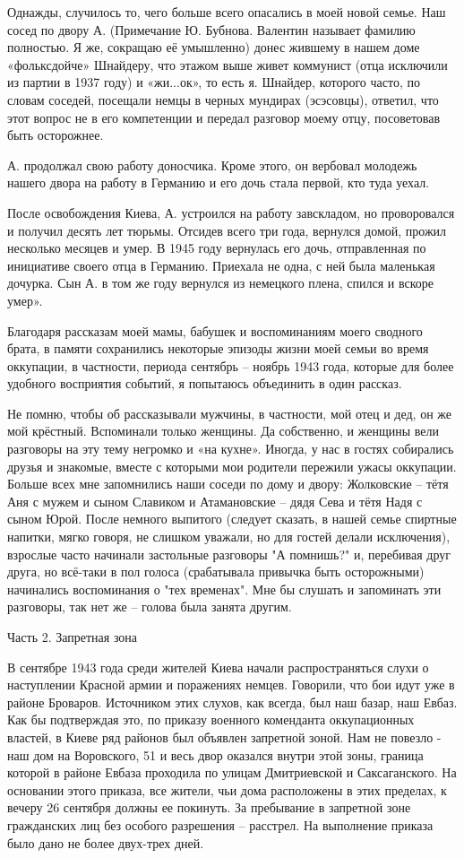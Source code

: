 Однажды, случилось то, чего больше всего опасались в моей новой семье. Наш
сосед по двору А. (Примечание Ю. Бубнова. Валентин называет фамилию полностью.
Я же, сокращаю её умышленно) донес жившему в нашем доме «фольксдойче» Шнайдеру,
что этажом выше живет коммунист (отца исключили из партии в 1937 году) и
«жи...ок», то есть я. Шнайдер, которого часто, по словам соседей, посещали
немцы в черных мундирах (эсэсовцы), ответил, что этот вопрос не в его
компетенции и передал разговор моему отцу, посоветовав быть осторожнее.

А. продолжал свою работу доносчика. Кроме этого, он вербовал молодежь нашего
двора на работу в Германию и его дочь стала первой, кто туда уехал. 

После освобождения Киева, А. устроился на работу завскладом, но проворовался и
получил десять лет тюрьмы. Отсидев всего три года, вернулся домой, прожил
несколько месяцев и умер. В 1945 году вернулась его дочь, отправленная по
инициативе своего отца в Германию. Приехала не одна, с ней была маленькая
дочурка. Сын А. в том же году вернулся из немецкого плена, спился и вскоре
умер».

Благодаря рассказам моей мамы, бабушек и воспоминаниям моего сводного брата, в
памяти сохранились некоторые эпизоды жизни моей семьи во время оккупации, в
частности, периода сентябрь – ноябрь 1943 года, которые для более удобного
восприятия событий, я попытаюсь объединить в один рассказ.

Не помню, чтобы об рассказывали мужчины, в частности, мой отец и дед, он же мой
крёстный. Вспоминали только женщины. Да собственно, и женщины вели разговоры на
эту тему негромко и «на кухне». Иногда, у нас в гостях собирались друзья и
знакомые, вместе с которыми мои родители пережили ужасы оккупации. Больше всех
мне запомнились наши соседи по дому и двору: Жолковские – тётя Аня с мужем и
сыном Славиком и Атамановские – дядя Сева и тётя Надя с сыном Юрой. После
немного выпитого (следует сказать, в нашей семье спиртные напитки, мягко
говоря, не слишком уважали, но для гостей делали исключения), взрослые часто
начинали застольные разговоры "А помнишь?" и, перебивая друг друга, но всё-таки
в пол голоса (срабатывала привычка быть осторожными) начинались воспоминания о
"тех временах". Мне бы слушать и запоминать эти разговоры, так нет же – голова
была занята другим.

Часть 2. Запретная зона

В сентябре 1943 года среди жителей Киева начали распространяться слухи о
наступлении Красной армии и поражениях немцев. Говорили, что бои идут уже в
районе Броваров. Источником этих слухов, как всегда, был наш базар, наш Евбаз.
Как бы подтверждая это, по приказу военного коменданта оккупационных властей, в
Киеве ряд районов был объявлен запретной зоной. Нам не повезло - наш дом на
Воровского, 51 и весь двор оказался внутри этой зоны, граница которой в районе
Евбаза проходила по улицам Дмитриевской и Саксаганского. На основании этого
приказа, все жители, чьи дома расположены в этих пределах, к вечеру 26 сентября
должны ее покинуть. За пребывание в запретной зоне гражданских лиц без особого
разрешения – расстрел. На выполнение приказа было дано не более двух-трех дней.

